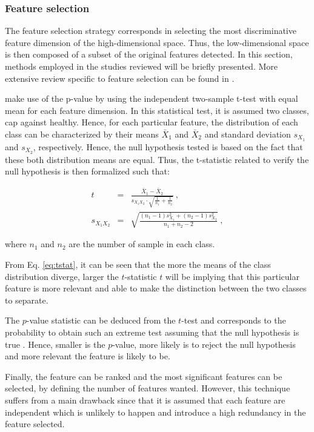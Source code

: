 \subsubsection{Feature selection}\label{subsubsec:featsel}

The feature selection strategy corresponds in selecting the most discriminative feature dimension of the high-dimensional space. Thus, the low-dimensional space is then composed of a subset of the original features detected. In this section, methods employed in the studies reviewed will be briefly presented. More extensive review specific to feature selection can be found in \cite{Saeys2007}.

\cite{Niaf2011,Niaf2012} make use of the p-value by using the independent two-sample t-test with equal mean for each feature dimension. In this statistical test, it is assumed two classes, \ac{cap} against healthy. Hence, for each particular feature, the distribution of each class can be characterized by their means $\bar{X}_1$ and $\bar{X}_2$ and standard deviation $s_{X_1}$ and $s_{X_2}$, respectively. Hence, the null hypothesis tested is based on the fact that these both distribution means are equal. Thus, the t-statistic related to verify the null hypothesis is then formalized such that:

\begin{eqnarray}
t & = & \frac{\bar {X}_1 - \bar{X}_2}{s_{X_1X_2} \cdot \sqrt{\frac{1}{n_1}+\frac{1}{n_2}}} \ , \label{eq:tstat} \\
s_{X_1X_2} & = & \sqrt{\frac{(n_1-1)s_{X_1}^2+(n_2-1)s_{X_2}^2}{n_1+n_2-2}} \ , \nonumber
\end{eqnarray}

\noindent where $n_1$ and $n_2$ are the number of sample in each class.

From Eq. \eqref{eq:tstat}, it can be seen that the more the means of the class distribution diverge, larger the $t$-statistic $t$ will be implying that this particular feature is more relevant and able to make the distinction between the two classes to separate. 

The $p$-value statistic can be deduced from the $t$-test and corresponds to the probability to obtain such an extreme test assuming that the null hypothesis is true \cite{Goodman1999}. Hence, smaller is the $p$-value, more likely is to reject the null hypothesis and more relevant the feature is likely to be.

Finally, the feature can be ranked and the most significant features can be selected, by defining the number of features wanted. However, this technique suffers from a main drawback since that it is assumed that each feature are independent which is unlikely to happen and introduce a high redundancy in the feature selected.

